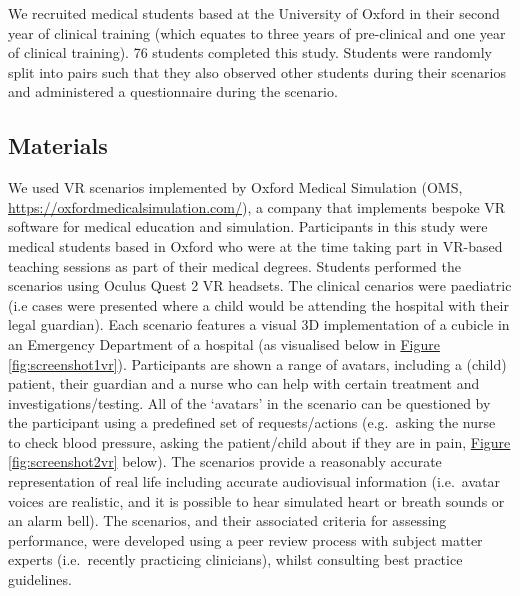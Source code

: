 \documentclass[a4paper, nobind]{templates/ociamthesis}
\begin{document}
We recruited medical students based at the University of Oxford in their second year of clinical training (which equates to three years of pre-clinical and one year of clinical training). 76 students completed this study. Students were randomly split into pairs such that they also observed other students during their scenarios and administered a questionnaire during the scenario.

\subsection{Materials}\label{materials-2}

We used VR scenarios implemented by Oxford Medical Simulation (OMS, \url{https://oxfordmedicalsimulation.com/}), a company that implements bespoke VR software for medical education and simulation. Participants in this study were medical students based in Oxford who were at the time taking part in VR-based teaching sessions as part of their medical degrees. Students performed the scenarios using Oculus Quest 2 VR headsets. The clinical cenarios were paediatric (i.e cases were presented where a child would be attending the hospital with their legal guardian). Each scenario features a visual 3D implementation of a cubicle in an Emergency Department of a hospital (as visualised below in \hyperref[fig:screenshot1vr]{Figure \ref{fig:screenshot1vr}}). Participants are shown a range of avatars, including a (child) patient, their guardian and a nurse who can help with certain treatment and investigations/testing. All of the `avatars' in the scenario can be questioned by the participant using a predefined set of requests/actions (e.g.~asking the nurse to check blood pressure, asking the patient/child about if they are in pain, \hyperref[fig:screenshot2vr]{Figure \ref{fig:screenshot2vr}} below). The scenarios provide a reasonably accurate representation of real life including accurate audiovisual information (i.e.~avatar voices are realistic, and it is possible to hear simulated heart or breath sounds or an alarm bell). The scenarios, and their associated criteria for assessing performance, were developed using a peer review process with subject matter experts (i.e.~recently practicing clinicians), whilst consulting best practice guidelines.

\newpage
\end{document}
